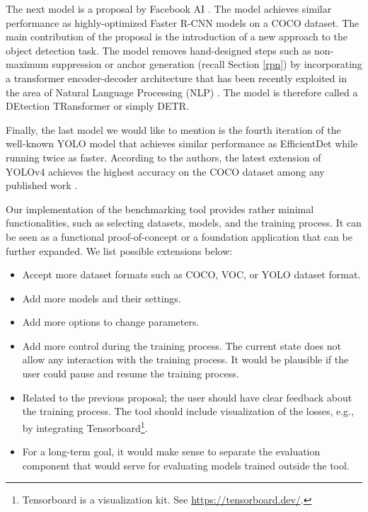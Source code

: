 The next model is a proposal by Facebook AI \cite{detr}. The model achieves similar
performance as highly-optimized Faster R-CNN models on a COCO dataset. The main
contribution of the proposal is the introduction of a new approach to the object
detection task. The model removes hand-designed steps such as non-maximum
suppression or anchor generation (recall Section \ref{rpn}) by incorporating a
transformer encoder-decoder architecture \cite{transformer} that has been
recently exploited in the area of Natural Language Processing (NLP)
\cite{bert, gpt3}. The model is therefore called a DEtection TRansformer or
simply DETR.

Finally, the last model we would like to mention is the fourth iteration of the
well-known YOLO model \cite{yolo1, yolo2, yolo3, yolo4} that achieves similar
performance as EfficientDet while running twice as faster. According to the
authors, the latest extension of YOLOv4 achieves the highest accuracy on the
COCO dataset among any published work \cite{yolo4scaled}.

Our implementation of the benchmarking tool provides rather minimal
functionalities, such as selecting datasets, models, and the training process.
It can be seen as a functional proof-of-concept or a foundation application that
can be further expanded. We list possible extensions below:
\begin{itemize}
      \item Accept more dataset formats such as COCO, VOC, or YOLO dataset format.
      \item Add more models and their settings.
      \item Add more options to change parameters.
      \item Add more control during the training process. The current state does
            not allow any interaction with the training process. It would be
            plausible if the user could pause and resume the training process.
      \item Related to the previous proposal; the user should have clear feedback
            about the training process. The tool should include visualization of
            the losses, e.g., by integrating Tensorboard\footnote{
                  Tensorboard is a visualization kit. See
                  \url{https://tensorboard.dev/}.
            }.
      \item For a long-term goal, it would make sense to separate the evaluation
            component that would serve for evaluating models trained outside the
            tool.
\end{itemize}